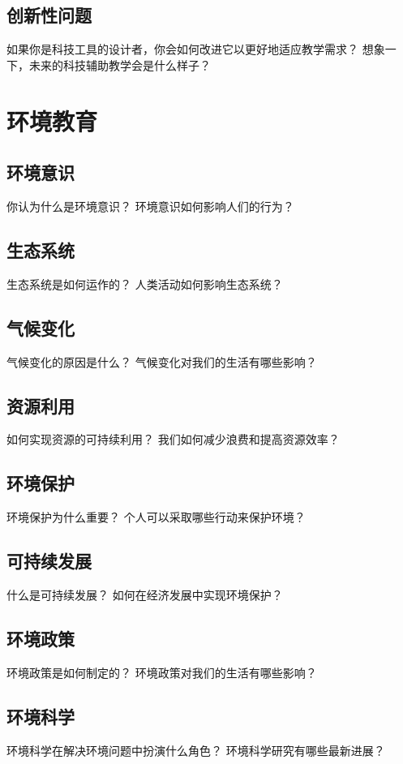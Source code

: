 \documentclass[12pt]{book}
\begin{document}
\subsection{创新性问题}
如果你是科技工具的设计者，你会如何改进它以更好地适应教学需求？
想象一下，未来的科技辅助教学会是什么样子？


\section{环境教育}
\subsection{环境意识}
你认为什么是环境意识？
环境意识如何影响人们的行为？

\subsection{生态系统}
生态系统是如何运作的？
人类活动如何影响生态系统？

\subsection{气候变化}
气候变化的原因是什么？
气候变化对我们的生活有哪些影响？

\subsection{资源利用}
如何实现资源的可持续利用？
我们如何减少浪费和提高资源效率？

\subsection{环境保护}
环境保护为什么重要？
个人可以采取哪些行动来保护环境？

\subsection{可持续发展}
什么是可持续发展？
如何在经济发展中实现环境保护？

\subsection{环境政策}
环境政策是如何制定的？
环境政策对我们的生活有哪些影响？

\subsection{环境科学}
环境科学在解决环境问题中扮演什么角色？
环境科学研究有哪些最新进展？
\end{document}
